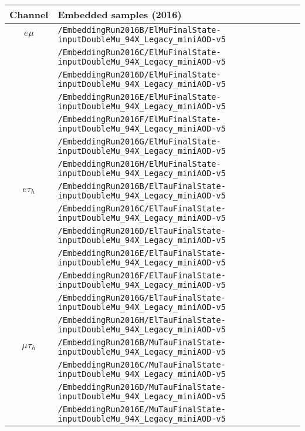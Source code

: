 \begin{table}[ht]
    \begin{center}
    {\scriptsize
    \begin{tabular}{|c|l|}
    \hline
    Channel & Embedded samples (2016)\\
    \hline
    $e\mu$ & \texttt{/EmbeddingRun2016B/ElMuFinalState-inputDoubleMu\_94X\_Legacy\_miniAOD-v5}\\
    & \texttt{/EmbeddingRun2016C/ElMuFinalState-inputDoubleMu\_94X\_Legacy\_miniAOD-v5}\\
    & \texttt{/EmbeddingRun2016D/ElMuFinalState-inputDoubleMu\_94X\_Legacy\_miniAOD-v5}\\
    & \texttt{/EmbeddingRun2016E/ElMuFinalState-inputDoubleMu\_94X\_Legacy\_miniAOD-v5}\\
    & \texttt{/EmbeddingRun2016F/ElMuFinalState-inputDoubleMu\_94X\_Legacy\_miniAOD-v5}\\
    & \texttt{/EmbeddingRun2016G/ElMuFinalState-inputDoubleMu\_94X\_Legacy\_miniAOD-v5}\\
    & \texttt{/EmbeddingRun2016H/ElMuFinalState-inputDoubleMu\_94X\_Legacy\_miniAOD-v5}\\
    \hline
    $e\tau_{h}$ & \texttt{/EmbeddingRun2016B/ElTauFinalState-inputDoubleMu\_94X\_Legacy\_miniAOD-v5}\\
    & \texttt{/EmbeddingRun2016C/ElTauFinalState-inputDoubleMu\_94X\_Legacy\_miniAOD-v5}\\
    & \texttt{/EmbeddingRun2016D/ElTauFinalState-inputDoubleMu\_94X\_Legacy\_miniAOD-v5}\\
    & \texttt{/EmbeddingRun2016E/ElTauFinalState-inputDoubleMu\_94X\_Legacy\_miniAOD-v5}\\
    & \texttt{/EmbeddingRun2016F/ElTauFinalState-inputDoubleMu\_94X\_Legacy\_miniAOD-v5}\\
    & \texttt{/EmbeddingRun2016G/ElTauFinalState-inputDoubleMu\_94X\_Legacy\_miniAOD-v5}\\
    & \texttt{/EmbeddingRun2016H/ElTauFinalState-inputDoubleMu\_94X\_Legacy\_miniAOD-v5}\\
    \hline
    $\mu\tau_{h}$ & \texttt{/EmbeddingRun2016B/MuTauFinalState-inputDoubleMu\_94X\_Legacy\_miniAOD-v5}\\
    & \texttt{/EmbeddingRun2016C/MuTauFinalState-inputDoubleMu\_94X\_Legacy\_miniAOD-v5}\\
    & \texttt{/EmbeddingRun2016D/MuTauFinalState-inputDoubleMu\_94X\_Legacy\_miniAOD-v5}\\
    & \texttt{/EmbeddingRun2016E/MuTauFinalState-inputDoubleMu\_94X\_Legacy\_miniAOD-v5}\\

\end{tabular}}
\end{center}
\end{table}
